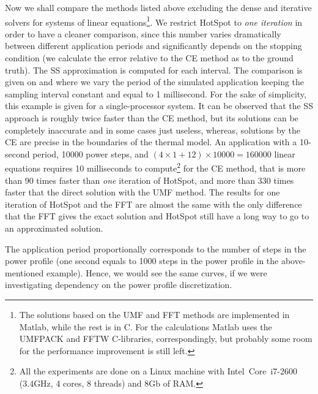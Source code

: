Now we shall compare the methods listed above excluding the dense and iterative solvers for systems of linear equations\footnote{The solutions based on the UMF and FFT methods are implemented in Matlab, while the rest is in C. For the calculations Matlab uses the UMFPACK and FFTW C-libraries, correspondingly, but probably some room for the performance improvement is still left.}. We restrict HotSpot to \emph{one iteration} in order to have a cleaner comparison, since this number varies dramatically between different application periods and significantly depends on the stopping condition (we calculate the error relative to the CE method as to the ground truth). The SS approximation is computed for each interval. The comparison is given on  and  where we vary the period of the simulated application keeping the sampling interval constant and equal to 1 millisecond. For the sake of simplicity, this example is given for a single-processor system. It can be observed that the SS approach is roughly twice faster than the CE method, but its solutions can be completely inaccurate and in some cases just useless, whereas, solutions by the CE are precise in the boundaries of the thermal model. An application with a 10-second period, 10000 power steps, and $(4 \times 1 + 12) \times 10000 = 160000$ linear equations requires 10 milliseconds to compute\footnote{All the experiments are done on a Linux machine with Intel\textregistered\ Core\texttrademark\ i7-2600 (3.4GHz, 4 cores, 8 threads) and 8Gb of RAM.} for the CE method, that is more than 90 times faster than \emph{one} iteration of HotSpot, and more than 330 times faster that the direct solution with the UMF method. The results for one iteration of HotSpot and the FFT are almost the same with the only difference that the FFT gives the exact solution and HotSpot still have a long way to go to an approximated solution.

The application period proportionally corresponds to the number of steps in the power profile (one second equals to 1000 steps in the power profile in the above-mentioned example). Hence, we would see the same curves, if we were investigating dependency on the power profile discretization.

